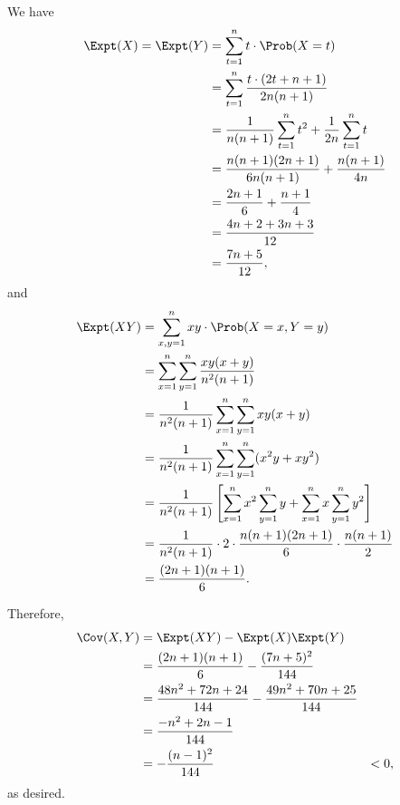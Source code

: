 \begin{enumerate}
    We have
    \begin{align*}
        \Expt(X) = \Expt(Y) &= \sum_{t = 1}^{n} t \cdot \Prob(X = t)\\
        &= \sum_{t = 1}^{n} \frac{t \cdot (2t + n + 1)}{2n(n+1)}\\
        &= \frac{1}{n(n+1)} \sum_{t = 1}^{n} t^2 + \frac{1}{2n} \sum_{t = 1}^{n} t\\
        &= \frac{n(n+1)(2n+1)}{6n(n+1)} + \frac{n(n+1)}{4n}\\
        &= \frac{2n+1}{6} + \frac{n+1}{4}\\
        &= \frac{4n+2+3n+3}{12}\\
        &= \frac{7n+5}{12},
    \end{align*}
    and
    \begin{align*}
        \Expt(XY) &= \sum_{x, y = 1}^{n} xy \cdot \Prob(X = x, Y = y)\\
        &= \sum_{x = 1}^{n} \sum_{y = 1}^{n} \frac{xy(x + y)}{n^2(n+1)}\\
        &= \frac{1}{n^2(n+1)} \sum_{x = 1}^{n} \sum_{y = 1}^{n} xy(x + y)\\
        &= \frac{1}{n^2(n+1)} \sum_{x = 1}^{n} \sum_{y = 1}^{n} (x^2y + xy^2)\\
        &= \frac{1}{n^2(n+1)} \left[\sum_{x = 1}^{n} x^2 \sum_{y = 1}^{n} y + \sum_{x = 1}^{n} x \sum_{y = 1}^{n} y^2\right]\\
        &= \frac{1}{n^2(n+1)} \cdot 2 \cdot \frac{n(n+1)(2n+1)}{6} \cdot \frac{n(n+1)}{2}\\
        &= \frac{(2n+1)(n+1)}{6}.
    \end{align*}

    Therefore,
    \begin{align*}
        \Cov(X, Y) &= \Expt(XY) - \Expt(X)\Expt(Y)\\
        &= \frac{(2n+1)(n+1)}{6} - \frac{(7n+5)^2}{144}\\
        &= \frac{48n^2 + 72n + 24}{144} - \frac{49n^2 + 70n + 25}{144}\\
        &= \frac{-n^2 + 2n - 1}{144}\\
        &= -\frac{(n-1)^2}{144}
        &< 0,
    \end{align*}
    as desired.
\end{enumerate}